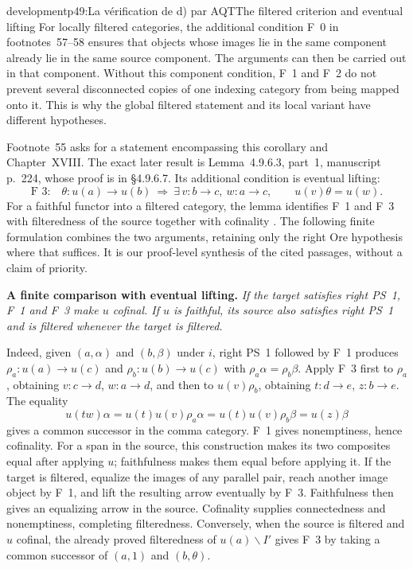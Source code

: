 \begin{dcomment}{development}{p49:La vérification de d) par AQT}{The filtered criterion and eventual lifting}
For locally filtered categories, the additional condition F~0 in footnotes~57--58 ensures that objects whose images lie in the same component already lie in the same source component. The arguments can then be carried out in that component. Without this component condition, F~1 and F~2 do not prevent several disconnected copies of one indexing category from being mapped onto it. This is why the global filtered statement and its local variant have different hypotheses.

Footnote~55 asks for a statement encompassing this corollary and Chapter~XVIII. The exact later result is Lemma~4.9.6.3, part~1, manuscript p.~224, whose proof is in \S4.9.6.7. Its additional condition is eventual lifting:
\[
 \text{F~3:}\quad
 \theta:u(a)\longrightarrow u(b)
 \ \Longrightarrow\
 \exists\,v:b\longrightarrow c,\ w:a\longrightarrow c,
 \qquad u(v)\theta=u(w).
\]
For a faithful functor into a filtered category, the lemma identifies F~1 and F~3 with filteredness of the source together with cofinality \citep[Lemma~4.9.6.3(1), pp.~81--82]{Grothendieck1990XVIII}. The following finite formulation combines the two arguments, retaining only the right Ore hypothesis where that suffices. It is our proof-level synthesis of the cited passages, without a claim of priority.

\textbf{A finite comparison with eventual lifting.}\ours
\textit{If the target satisfies right PS~1, F~1 and F~3 make $u$ cofinal. If $u$ is faithful, its source also satisfies right PS~1 and is filtered whenever the target is filtered.}

Indeed, given $(a,\alpha)$ and $(b,\beta)$ under $i$, right PS~1 followed by F~1 produces $\rho_a:u(a)\to u(c)$ and $\rho_b:u(b)\to u(c)$ with $\rho_a\alpha=\rho_b\beta$. Apply F~3 first to $\rho_a$, obtaining $v:c\to d$, $w:a\to d$, and then to $u(v)\rho_b$, obtaining $t:d\to e$, $z:b\to e$. The equality
\[
 u(tw)\alpha=u(t)u(v)\rho_a\alpha
              =u(t)u(v)\rho_b\beta=u(z)\beta
\]
gives a common successor in the comma category. F~1 gives nonemptiness, hence cofinality. For a span in the source, this construction makes its two composites equal after applying $u$; faithfulness makes them equal before applying it. If the target is filtered, equalize the images of any parallel pair, reach another image object by F~1, and lift the resulting arrow eventually by F~3. Faithfulness then gives an equalizing arrow in the source. Cofinality supplies connectedness and nonemptiness, completing filteredness. Conversely, when the source is filtered and $u$ cofinal, the already proved filteredness of $u(a)\backslash I'$ gives F~3 by taking a common successor of $(a,1)$ and $(b,\theta)$.


\end{dcomment}
